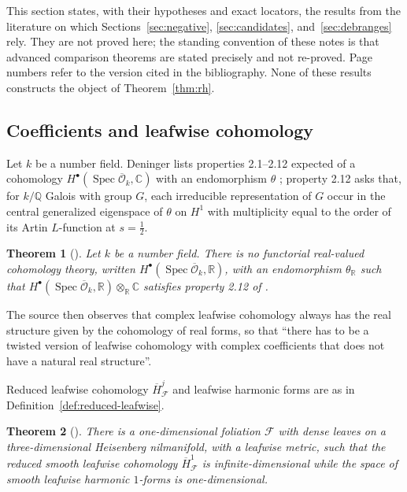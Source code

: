 \documentclass[11pt]{amsart}
\theoremstyle{plain}
\newtheorem{theorem}{Theorem}[section]
\theoremstyle{definition}
\theoremstyle{remark}
\numberwithin{equation}{section}
\newcommand{\C}{\mathbb{C}}
\newcommand{\R}{\mathbb{R}}
\newcommand{\Q}{\mathbb{Q}}
\newcommand{\cO}{\mathcal{O}}
\DeclareMathOperator{\Spec}{Spec}
\begin{document}
This section states, with their hypotheses and exact locators, the
results from the literature on which Sections~\ref{sec:negative},
\ref{sec:candidates}, and~\ref{sec:debranges} rely. They are not proved
here; the standing convention of these notes is that advanced
comparison theorems are stated precisely and not re-proved. Page numbers
refer to the version cited in the bibliography. None of these results
constructs the object of Theorem~\ref{thm:rh}.

\subsection{Coefficients and leafwise cohomology}

Let $k$ be a number field. Deninger lists properties 2.1--2.12 expected
of a cohomology $H^\bullet(\Spec\overline{\cO}_k,\C)$ with an
endomorphism $\theta$ \cite[pp.~2--5]{Deninger2022NoWeil}; property 2.12
asks that, for $k/\Q$ Galois with group $G$, each irreducible
representation of $G$ occur in the central generalized eigenspace of
$\theta$ on $H^1$ with multiplicity equal to the order of its Artin
$L$-function at $s=\tfrac12$.

\begin{theorem}[{\cite[Theorem~2.13, p.~5]{Deninger2022NoWeil}}]
\label{thm:imp-deninger-nogo}
Let $k$ be a number field. There is no functorial real-valued
cohomology theory, written
$H^\bullet(\Spec\overline{\cO}_k,\R)$, with an endomorphism
$\theta_\R$ such that
$H^\bullet(\Spec\overline{\cO}_k,\R)\otimes_\R\C$ satisfies property
2.12 of \cite{Deninger2022NoWeil}.
\end{theorem}

The source then observes \cite[pp.~5--6]{Deninger2022NoWeil} that
complex leafwise cohomology always has the real structure given by the
cohomology of real forms, so that ``there has to be a twisted version of
leafwise cohomology with complex coefficients that does not have a
natural real structure''.

Reduced leafwise cohomology $\overline H^j_{\mathcal F}$ and leafwise
harmonic forms are as in Definition~\ref{def:reduced-leafwise}.

\begin{theorem}[{\cite[Proposition~1.2 and~(12), p.~214]%
{DeningerSinghof2001Counterexample}}]\label{thm:imp-ds}
There is a one-dimensional foliation $\mathcal F$ with dense leaves on
a three-dimensional Heisenberg nilmanifold, with a leafwise metric,
such that the reduced smooth leafwise cohomology
$\overline H^1_{\mathcal F}$ is infinite-dimensional while the space of
smooth leafwise harmonic $1$-forms is one-dimensional.
\end{theorem}
\end{document}
